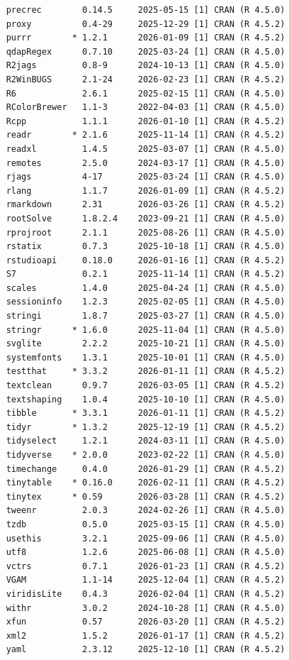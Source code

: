 \documentclass[
  11pt,
  a4paper,
]{article}
\begin{document}
\begin{tcolorbox}[enhanced jigsaw, arc=.35mm, bottomrule=.15mm, breakable, colback=white, colframe=quarto-callout-color-frame, left=2mm, leftrule=.75mm, opacityback=0, rightrule=.15mm, toprule=.15mm]
\begin{verbatim}
    precrec        0.14.5     2025-05-15 [1] CRAN (R 4.5.0)
    proxy          0.4-29     2025-12-29 [1] CRAN (R 4.5.2)
    purrr        * 1.2.1      2026-01-09 [1] CRAN (R 4.5.2)
    qdapRegex      0.7.10     2025-03-24 [1] CRAN (R 4.5.0)
    R2jags         0.8-9      2024-10-13 [1] CRAN (R 4.5.0)
    R2WinBUGS      2.1-24     2026-02-23 [1] CRAN (R 4.5.2)
    R6             2.6.1      2025-02-15 [1] CRAN (R 4.5.0)
    RColorBrewer   1.1-3      2022-04-03 [1] CRAN (R 4.5.0)
    Rcpp           1.1.1      2026-01-10 [1] CRAN (R 4.5.2)
    readr        * 2.1.6      2025-11-14 [1] CRAN (R 4.5.2)
    readxl         1.4.5      2025-03-07 [1] CRAN (R 4.5.0)
    remotes        2.5.0      2024-03-17 [1] CRAN (R 4.5.0)
    rjags          4-17       2025-03-24 [1] CRAN (R 4.5.0)
    rlang          1.1.7      2026-01-09 [1] CRAN (R 4.5.2)
    rmarkdown      2.31       2026-03-26 [1] CRAN (R 4.5.2)
    rootSolve      1.8.2.4    2023-09-21 [1] CRAN (R 4.5.0)
    rprojroot      2.1.1      2025-08-26 [1] CRAN (R 4.5.0)
    rstatix        0.7.3      2025-10-18 [1] CRAN (R 4.5.0)
    rstudioapi     0.18.0     2026-01-16 [1] CRAN (R 4.5.2)
    S7             0.2.1      2025-11-14 [1] CRAN (R 4.5.2)
    scales         1.4.0      2025-04-24 [1] CRAN (R 4.5.0)
    sessioninfo    1.2.3      2025-02-05 [1] CRAN (R 4.5.0)
    stringi        1.8.7      2025-03-27 [1] CRAN (R 4.5.0)
    stringr      * 1.6.0      2025-11-04 [1] CRAN (R 4.5.0)
    svglite        2.2.2      2025-10-21 [1] CRAN (R 4.5.0)
    systemfonts    1.3.1      2025-10-01 [1] CRAN (R 4.5.0)
    testthat     * 3.3.2      2026-01-11 [1] CRAN (R 4.5.2)
    textclean      0.9.7      2026-03-05 [1] CRAN (R 4.5.2)
    textshaping    1.0.4      2025-10-10 [1] CRAN (R 4.5.0)
    tibble       * 3.3.1      2026-01-11 [1] CRAN (R 4.5.2)
    tidyr        * 1.3.2      2025-12-19 [1] CRAN (R 4.5.2)
    tidyselect     1.2.1      2024-03-11 [1] CRAN (R 4.5.0)
    tidyverse    * 2.0.0      2023-02-22 [1] CRAN (R 4.5.0)
    timechange     0.4.0      2026-01-29 [1] CRAN (R 4.5.2)
    tinytable    * 0.16.0     2026-02-11 [1] CRAN (R 4.5.2)
    tinytex      * 0.59       2026-03-28 [1] CRAN (R 4.5.2)
    tweenr         2.0.3      2024-02-26 [1] CRAN (R 4.5.0)
    tzdb           0.5.0      2025-03-15 [1] CRAN (R 4.5.0)
    usethis        3.2.1      2025-09-06 [1] CRAN (R 4.5.0)
    utf8           1.2.6      2025-06-08 [1] CRAN (R 4.5.0)
    vctrs          0.7.1      2026-01-23 [1] CRAN (R 4.5.2)
    VGAM           1.1-14     2025-12-04 [1] CRAN (R 4.5.2)
    viridisLite    0.4.3      2026-02-04 [1] CRAN (R 4.5.2)
    withr          3.0.2      2024-10-28 [1] CRAN (R 4.5.0)
    xfun           0.57       2026-03-20 [1] CRAN (R 4.5.2)
    xml2           1.5.2      2026-01-17 [1] CRAN (R 4.5.2)
    yaml           2.3.12     2025-12-10 [1] CRAN (R 4.5.2)


\end{verbatim}
\end{tcolorbox}
\end{document}

